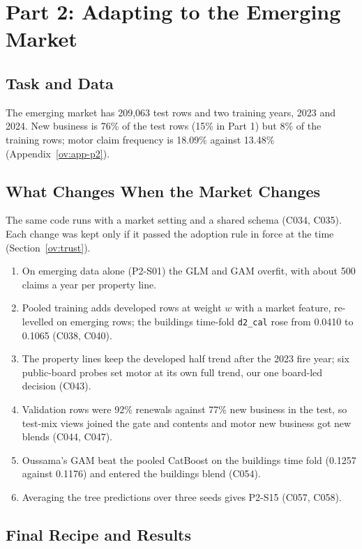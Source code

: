 \section{Part 2: Adapting to the Emerging Market}

\subsection{Task and Data}

The emerging market has 209,063 test rows and two training years, 2023 and 2024. New business is 76\% of the test rows
(15\% in Part 1) but 8\% of the training rows; motor claim frequency is 18.09\% against 13.48\%
(Appendix~\ref{ov:app-p2}).

\subsection{What Changes When the Market Changes}

The same code runs with a market setting and a shared schema (C034, C035). Each change was kept only if it passed the
adoption rule in force at the time (Section~\ref{ov:trust}).

\begin{enumerate}
\item On emerging data alone (P2-S01) the GLM and GAM overfit, with about 500 claims a year per property line.
\item Pooled training adds developed rows at weight $w$ with a market feature, re-levelled on emerging rows; the
buildings time-fold \texttt{d2\_cal} rose from 0.0410 to 0.1065 (C038, C040).
\item The property lines keep the developed half trend after the 2023 fire year; six public-board probes set motor at
its own full trend, our one board-led decision (C043).
\item Validation rows were 92\% renewals against 77\% new business in the test, so test-mix views joined the gate and
contents and motor new business got new blends (C044, C047).
\item Oussama's GAM beat the pooled CatBoost on the buildings time fold (0.1257 against 0.1176) and entered the
buildings blend (C054).
\item Averaging the tree predictions over three seeds gives P2-S15 (C057, C058).
\end{enumerate}

\subsection{Final Recipe and Results}


